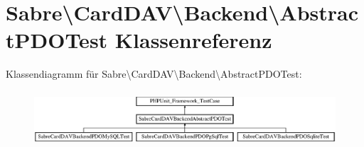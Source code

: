 \hypertarget{class_sabre_1_1_card_d_a_v_1_1_backend_1_1_abstract_p_d_o_test}{}\section{Sabre\textbackslash{}Card\+D\+AV\textbackslash{}Backend\textbackslash{}Abstract\+P\+D\+O\+Test Klassenreferenz}
\label{class_sabre_1_1_card_d_a_v_1_1_backend_1_1_abstract_p_d_o_test}
Klassendiagramm für Sabre\textbackslash{}Card\+D\+AV\textbackslash{}Backend\textbackslash{}Abstract\+P\+D\+O\+Test\+:\begin{figure}[H]
\begin{center}
\leavevmode
\includegraphics[height=2.097378cm]{class_sabre_1_1_card_d_a_v_1_1_backend_1_1_abstract_p_d_o_test}
\end{center}
\end{figure}
